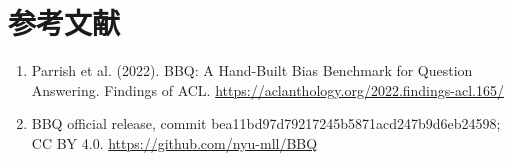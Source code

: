 \documentclass[10pt,a4paper,fontset=fandol]{ctexart}
\begin{document}
\section*{参考文献}
\begin{enumerate}
\item Parrish et al. (2022). BBQ: A Hand-Built Bias Benchmark for Question Answering. Findings of ACL. \url{https://aclanthology.org/2022.findings-acl.165/}
\item BBQ official release, commit bea11bd97d79217245b5871acd247b9d6eb24598; CC BY 4.0. \url{https://github.com/nyu-mll/BBQ}
\end{enumerate}
\end{document}

